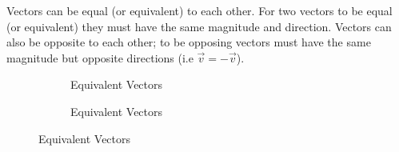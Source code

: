 \documentclass[12.5pt]{article}
\begin{document}
\begin{flushleft}
\begin{itemize}
{\begin{center}

                    \end{center}
                                        
                } 

            \end{itemize}

            Vectors can be equal (or equivalent) to each other. For two vectors to be equal (or equivalent) 
            they must have the same magnitude and direction. Vectors can also be opposite to each other; to be
            opposing vectors must have the same magnitude but opposite directions 
            (i.e $\vec{v} = -\vec{v}$).

            \begin{figure}[h]
                \centering
                \begin{subfigure}[b]{0.4\linewidth}
                    \centering
                    \caption{Equivalent Vectors}
                \end{subfigure}
                \centering
                \begin{subfigure}[b]{0.4\linewidth}
                    \centering
                    \caption{Equivalent Vectors}
                \end{subfigure}
            \end{figure}

        \end{flushleft}
        \clearpage
\end{document}
